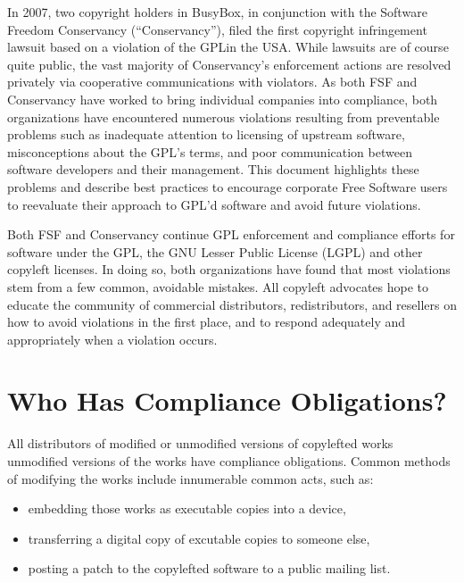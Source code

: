 In 2007, two copyright holders in BusyBox, in conjunction with the
Software Freedom Conservancy (``Conservancy''), filed the first copyright infringement lawsuit
based on a violation of the GPL\@ in the USA. While  lawsuits are of course
quite public, the vast majority of Conservancy's enforcement actions 
are resolved privately via
cooperative communications with violators.  As both FSF and Conservancy have worked to bring
individual companies into compliance, both organizations have encountered numerous
violations resulting from preventable problems such as inadequate
attention to licensing of upstream software, misconceptions about the
GPL's terms, and poor communication between software developers and their
management.  This document highlights these problems and describe
best practices to encourage corporate Free Software users to reevaluate their
approach to GPL'd software and avoid future violations.

Both FSF and Conservancy continue GPL enforcement and compliance efforts
for software under the GPL, the GNU Lesser
Public License (LGPL) and other copyleft licenses.  In doing so, both organizations have
found that most violations stem from a few common, avoidable mistakes.  All copyleft advocates  hope to educate the community of
commercial distributors, redistributors, and resellers on how to avoid
violations in the first place, and to respond adequately and appropriately
when a violation occurs.

\section{Who Has Compliance Obligations?}

All distributors of modified or unmodified versions of copylefted works
unmodified versions of the works have compliance obligations.  Common methods
of modifying the works include innumerable common acts, such as:

\begin{itemize}

  \item embedding those works as executable copies
    into a device,

  \item transferring a digital copy of excutable copies to someone else,

  \item posting a patch to the copylefted software to a public mailing list.

\end{itemize}

